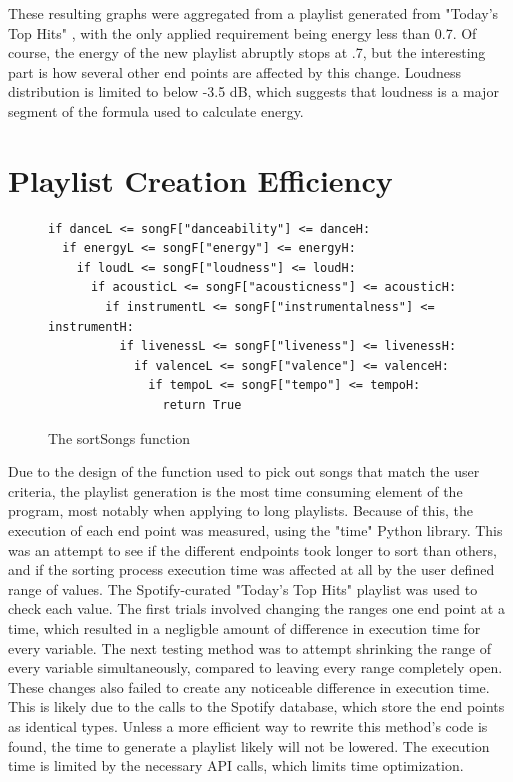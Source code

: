 These resulting graphs were aggregated from a playlist generated from "Today's Top Hits"
\cite{TopHits:19}, with the only applied requirement being energy less than 0.7.
Of course, the energy of the new playlist abruptly stops at .7, but the interesting
part is how several other end points are affected by this change. Loudness distribution
is limited to below -3.5 dB, which suggests that loudness is a major segment of the
formula used to calculate energy.

\section{Playlist Creation Efficiency}

\begin{figure}[!htb]
\begin{lstlisting}
if danceL <= songF["danceability"] <= danceH:
  if energyL <= songF["energy"] <= energyH:
    if loudL <= songF["loudness"] <= loudH:
      if acousticL <= songF["acousticness"] <= acousticH:
        if instrumentL <= songF["instrumentalness"] <= instrumentH:
          if livenessL <= songF["liveness"] <= livenessH:
            if valenceL <= songF["valence"] <= valenceH:
              if tempoL <= songF["tempo"] <= tempoH:
                return True
\end{lstlisting}
\caption{The sortSongs function}
\end{figure}

Due to the design of the function used to pick out songs that match the user
criteria, the playlist generation is the most time consuming element of the
program, most notably when applying to long playlists. Because of this, the
execution of each end point was measured, using the "time" Python library. This
was an attempt to see if the different endpoints took longer to sort than others,
and if the sorting process execution time was affected at all by the user defined
range of values. The Spotify-curated "Today's Top Hits" playlist \cite{TopHits:19}
was used to check each value. The first trials involved changing the ranges one
end point at a time, which resulted in a negligble amount of difference in
execution time for every variable. The next testing method was to attempt shrinking
the range of every variable simultaneously, compared to leaving every range
completely open. These changes also failed to create any noticeable difference
in execution time. This is likely due to the calls to the Spotify database,
which store the end points as identical types. Unless a more efficient way to
rewrite this method's code is found, the time to generate a playlist likely
will not be lowered. The execution time is limited by the necessary API calls,
which limits time optimization.

